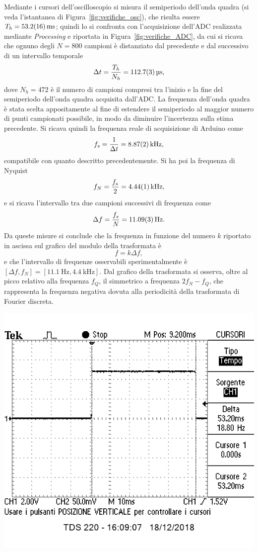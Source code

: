 \documentclass[10pt,oneside,a4paper]{article}
\newenvironment{Figure}
  {\par\medskip\noindent\minipage{\linewidth}}
  {\endminipage\par\medskip}
\begin{document}
\begin{multicols}{2}
Mediante i cursori dell'oscilloscopio si misura il semiperiodo dell'onda quadra (si veda l'istantanea di Figura~\ref{fig:verifiche_osc}), che risulta essere $T_h = \SI{53.2 \pm 1.6}{ms}$; quindi lo si confronta con l'acquisizione dell'ADC realizzata mediante \emph{Processing} e riportata in Figura~\ref{fig:verifiche_ADC}, da cui si ricava che ognuno degli $N=800$ campioni è distanziato dal precedente e dal successivo di un intervallo temporale
\[
\Delta t = \frac{T_h}{N_h} = \SI{112.7 \pm 0.3}{\micro s},
\]
dove $N_h = 472$ è il numero di campioni compresi tra l'inizio e la fine del semiperiodo dell'onda quadra acquisita dall'ADC. La frequenza dell'onda quadra è stata scelta appositamente al fine di estendere il semiperiodo al maggior numero di punti campionati possibile, in modo da diminuire l'incertezza sulla stima precedente. Si ricava quindi la frequenza reale di acquisizione di Arduino come
\[
f_s = \frac{1}{\Delta t} = \SI{8.87 \pm 0.02}{\kilo\Hz},
\]
compatibile con quanto descritto precedentemente. Si ha poi la frequenza di Nyquist
\[
f_N = \frac{f_s}{2} = \SI{4.44 \pm 0.01}{\kilo\Hz},
\]
e si ricava l'intervallo tra due campioni successivi di frequenza come
\[
\Delta f = \frac{f_s}{N} = \SI{11.09 \pm 0.03}{\Hz}.
\]
Da queste misure si conclude che la frequenza in funzione del numero $k$ riportato in ascissa sul grafico del modulo della trasformata è
\begin{equation}\label{eq:ktof}
f = k \Delta f,
\end{equation}
e che l'intervallo di frequenze osservabili sperimentalmente è $[\Delta f, f_N] = [\SI{11.1}{\Hz}, \SI{4.4}{\kilo\Hz}]$. Dal grafico della trasformata si osserva, oltre al picco relativo alla frequenza $f_Q$, il simmetrico a frequenza $2f_N - f_Q$, che rappresenta la frequenza negativa dovuta alla periodicità della trasformata di Fourier discreta.

\begin{Figure}
	\begin{center}
	\includegraphics[width=0.8\linewidth]{verificaosc}
	\label{fig:verifiche_osc}
	\end{center}
\end{Figure}


\end{multicols}
\end{document}
